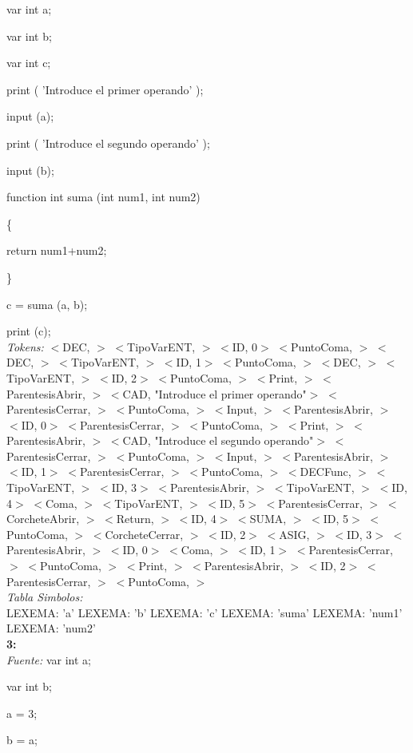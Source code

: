 \documentclass[a4paper, 12pt]{article}
\begin{document}
var int a;

var int b;

var int c;

print ( 'Introduce el primer operando' );

input (a);

print ( 'Introduce el segundo operando' );

input (b);
 
 function int suma (int num1, int num2)

\{

	return num1+num2;
	
\}

c = suma (a, b);

print (c);\medskip \\
\emph{Tokens:}
 $<$DEC, $>$ 
 $<$TipoVarENT, $>$ 
 $<$ID, 0$>$ 
 $<$PuntoComa, $>$ 
 $<$DEC, $>$ 
 $<$TipoVarENT, $>$ 
 $<$ID, 1$>$ 
 $<$PuntoComa, $>$ 
 $<$DEC, $>$ 
 $<$TipoVarENT, $>$ 
 $<$ID, 2$>$ 
 $<$PuntoComa, $>$
 $<$Print, $>$ 
 $<$ParentesisAbrir, $>$ 
 $<$CAD, \textnormal{"Introduce el primer operando"}$>$ 
 $<$ParentesisCerrar, $>$ 
 $<$PuntoComa, $>$ 
 $<$Input, $>$ 
 $<$ParentesisAbrir, $>$ 
 $<$ID, 0$>$ 
 $<$ParentesisCerrar, $>$ 
 $<$PuntoComa, $>$ 
 $<$Print, $>$ 
 $<$ParentesisAbrir, $>$ 
 $<$CAD, \textnormal{"Introduce el segundo operando"}$>$ 
 $<$ParentesisCerrar, $>$ 
 $<$PuntoComa, $>$
 $<$Input, $>$ 
 $<$ParentesisAbrir, $>$ 
 $<$ID, 1$>$ 
 $<$ParentesisCerrar, $>$ 
 $<$PuntoComa, $>$ 
 $<$DECFunc, $>$ 
 $<$TipoVarENT, $>$ 
 $<$ID, 3$>$ 
 $<$ParentesisAbrir, $>$ 
 $<$TipoVarENT, $>$
 $<$ID, 4$>$ 
 $<$Coma, $>$ 
 $<$TipoVarENT, $>$ 
 $<$ID, 5$>$ 
 $<$ParentesisCerrar, $>$ 
 $<$CorcheteAbrir, $>$ 
 $<$Return, $>$ 
 $<$ID, 4$>$ 
 $<$SUMA, $>$ 
 $<$ID, 5$>$ 
 $<$PuntoComa, $>$ 
 $<$CorcheteCerrar, $>$ 
 $<$ID, 2$>$ 
 $<$ASIG, $>$ 
 $<$ID, 3$>$ 
 $<$ParentesisAbrir, $>$ 
 $<$ID, 0$>$ 
 $<$Coma, $>$ 
 $<$ID, 1$>$ 
 $<$ParentesisCerrar, $>$ 
 $<$PuntoComa, $>$ 
 $<$Print, $>$ 
 $<$ParentesisAbrir, $>$ 
 $<$ID, 2$>$
 $<$ParentesisCerrar, $>$ 
 $<$PuntoComa, $>$\medskip\\
\emph{Tabla Simbolos:}\\ 
  LEXEMA: 'a'
  LEXEMA: 'b'
  LEXEMA: 'c'
  LEXEMA: 'suma'
  LEXEMA: 'num1'
  LEXEMA: 'num2'\bigskip\\
 \textbf{3:}\medskip \\
 \emph{Fuente:}
var int a;

var int b;

a = 3;

b = a;
\end{document}
